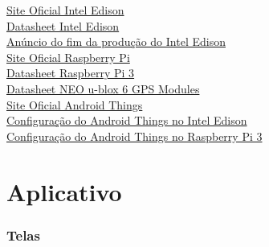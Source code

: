 \documentclass[
	12pt,				%
	oneside,			%
	a4paper,			%
	brazil				%
]{abntex2}
\begin{document}
\href{https://software.intel.com/en-us/iot/hardware/edison}{Site Oficial Intel Edison}\\
\href{http://download.intel.com/support/edison/sb/edisonmodule_hg_331189004.pdf}{Datasheet Intel Edison}\\
\href{https://www.embarcados.com.br/placas-intel-edison-galileo-e-joule-serao-descontinuadas/}{Anúncio do fim da produção do Intel Edison}\\
\href{https://www.raspberrypi.org/products/raspberry-pi-3-model-b/}{Site Oficial Raspberry Pi}\\
\href{https://www.raspberrypi.org/documentation/hardware/computemodule/RPI-CM-DATASHEET-V1_0.pdf}{Datasheet Raspberry Pi 3}\\
\href{https://www.u-blox.com/sites/default/files/products/documents/NEO-6_DataSheet_(GPS.G6-HW-09005).pdf}{Datasheet NEO u-blox 6 GPS Modules}\\
\href{https://developer.android.com/things/index.html}{Site Oficial Android Things}\\
\href{https://developer.android.com/things/hardware/edison.html}{Configuração do Android Things no Intel Edison}\\
\href{https://developer.android.com/things/hardware/raspberrypi.html}{Configuração do Android Things no Raspberry Pi 3}\\

\section{Aplicativo}

\subsubsection{Telas}
\end{document}
